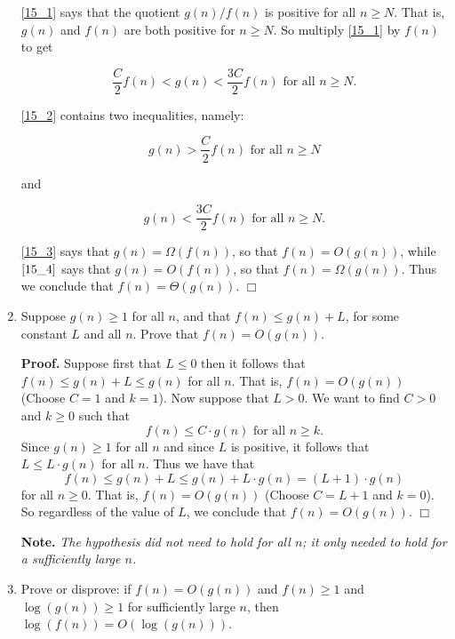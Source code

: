\documentclass[9pt]{article}
\newcommand{\qed}{\hfill \ensuremath{\Box}}
\begin{document}
\begin{enumerate}
      \eqref{15_1} says that the quotient $g(n)/f(n)$ is positive for all
      $n \ge N$. That is, $g(n)$ and $f(n)$ are both positive for $n \ge N$. So
      multiply \eqref{15_1} by $f(n)$ to get

      \begin{equation} \label{15_2}
         \frac{C}{2} f(n) < g(n) < \frac{3C}{2}f(n) \text{ for all } n \ge N.
      \end{equation}

      \eqref{15_2} contains two inequalities, namely:

      \begin{equation} \label{15_3}
         g(n) > \frac{C}{2} f(n) \text{ for all } n \ge N
      \end{equation}

      and

      \begin{equation} \label{15_4}
         g(n) < \frac{3C}{2}f(n) \text{ for all } n \ge N.
      \end{equation}

      \eqref{15_3} says that $g(n) = \Omega(f(n))$, so that $f(n) = O(g(n))$,
      while $\eqref{15_4}$ says that $g(n) = O(f(n))$, so that
      $f(n) = \Omega(g(n))$. Thus we conclude that $f(n) = \Theta(g(n))$. \qed
   \item Suppose $g(n) \ge 1$ for all $n$, and that $f(n) \le g(n) + L$, for
         some constant $L$ and all $n$. Prove that $f(n) = O(g(n))$.

      \textbf{Proof.} Suppose first that $L \le 0$ then it follows that
      $f(n) \le g(n) + L \le g(n)$ for all $n$. That is, $f(n) = O(g(n))$
      (Choose $C = 1$ and $k = 1$). Now suppose that $L > 0$. We want to find
      $C > 0$ and $k \ge 0$ such that
      $$f(n) \le C \cdot g(n) \text{ for all } n \ge k.$$
      Since $g(n) \ge 1$ for all $n$ and since $L$ is positive, it follows
      that $L \le L \cdot g(n)$ for all $n$. Thus we have that
      $$f(n) \le g(n) + L \le g(n) + L \cdot g(n) = (L+1) \cdot g(n)$$
      for all $n \ge 0$. That is, $f(n) = O(g(n))$ (Choose $C = L + 1$ and
      $k = 0$). So regardless of the value of $L$, we conclude that
      $f(n) = O(g(n))$. \qed

      \textbf{Note.} \textit{The hypothesis did not need to hold for all $n$; it 
      only needed to hold for a sufficiently large $n$.}
   \item Prove or disprove: if $f(n) = O(g(n))$ and $f(n) \ge 1$ and
         $\log(g(n)) \ge 1$ for sufficiently large $n$, then
         $\log(f(n)) = O(\log(g(n)))$.


\end{enumerate}
\end{document}
